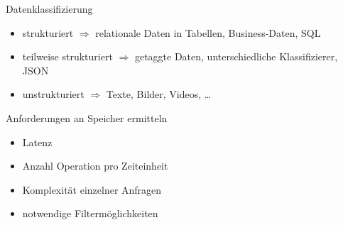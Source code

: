 
\begin{flashcard}[Definition]{Datenklassifizierung}
    \begin{itemize}
        \item strukturiert\newline
        $\Rightarrow$ relationale Daten in Tabellen, Business-Daten, SQL
        \item teilweise strukturiert\newline
        $\Rightarrow$ getaggte Daten, unterschiedliche Klassifizierer, JSON
        \item unstrukturiert\newline
        $\Rightarrow$ Texte, Bilder, Videos, \ldots
    \end{itemize}
\end{flashcard}

\begin{flashcard}[Definition]{Anforderungen an Speicher ermitteln}
    \begin{itemize}
        \item Latenz
        \item Anzahl Operation pro Zeiteinheit
        \item Komplexität einzelner Anfragen
        \item notwendige Filtermöglichkeiten
    \end{itemize}
\end{flashcard}


